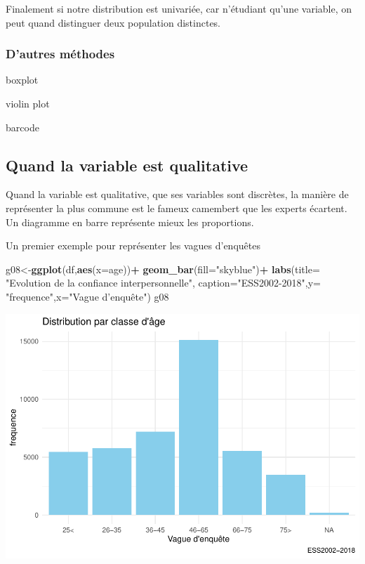 \documentclass[
]{book}
\newenvironment{Shaded}{\begin{snugshade}}{\end{snugshade}}
\newcommand{\DataTypeTok}[1]{\textcolor[rgb]{0.13,0.29,0.53}{#1}}
\newcommand{\KeywordTok}[1]{\textcolor[rgb]{0.13,0.29,0.53}{\textbf{#1}}}
\newcommand{\NormalTok}[1]{#1}
\newcommand{\OperatorTok}[1]{\textcolor[rgb]{0.81,0.36,0.00}{\textbf{#1}}}
\newcommand{\StringTok}[1]{\textcolor[rgb]{0.31,0.60,0.02}{#1}}
\begin{document}
Finalement si notre distribution est univariée, car n'étudiant qu'une variable, on peut quand distinguer deux population distinctes.

\hypertarget{dautres-muxe9thodes}{%
\subsubsection{D'autres méthodes}\label{dautres-muxe9thodes}}

boxplot

violin plot

barcode

\hypertarget{quand-la-variable-est-qualitative}{%
\subsection{Quand la variable est qualitative}\label{quand-la-variable-est-qualitative}}

Quand la variable est qualitative, que ses variables sont discrètes, la manière de représenter la plus commune est le fameux camembert que les experts écartent. Un diagramme en barre représente mieux les proportions.

Un premier exemple pour représenter les vagues d'enquêtes

\begin{Shaded}
\begin{Highlighting}[]
\NormalTok{g08<-}\KeywordTok{ggplot}\NormalTok{(df,}\KeywordTok{aes}\NormalTok{(}\DataTypeTok{x=}\NormalTok{age))}\OperatorTok{+}
\StringTok{  }\KeywordTok{geom_bar}\NormalTok{(}\DataTypeTok{fill=}\StringTok{"skyblue"}\NormalTok{)}\OperatorTok{+}
\StringTok{  }\KeywordTok{labs}\NormalTok{(}\DataTypeTok{title=} \StringTok{"Evolution de la confiance interpersonnelle"}\NormalTok{, }\DataTypeTok{caption=}\StringTok{"ESS2002-2018"}\NormalTok{,}\DataTypeTok{y=} \StringTok{"frequence"}\NormalTok{,}\DataTypeTok{x=}\StringTok{"Vague d'enquête") }
\StringTok{g08}
\end{Highlighting}
\end{Shaded}

\includegraphics{bookdown-demo_files/figure-latex/308-1.pdf}
\end{document}
